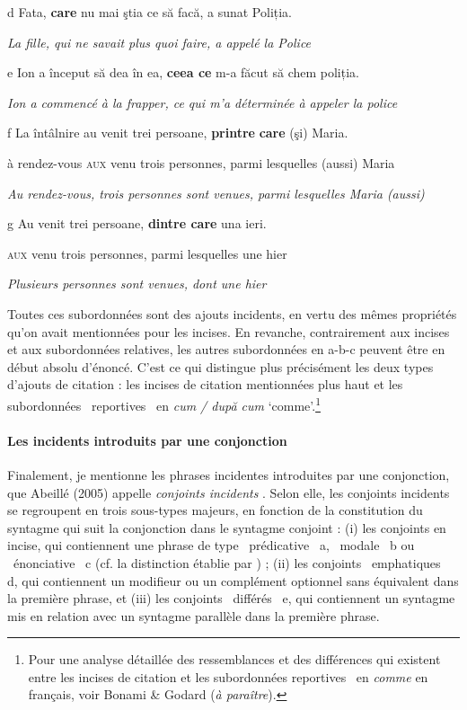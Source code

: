   d  Fata, \textbf{care} nu mai ştia ce să facă, a sunat Poliția.

{\itshape
La fille, qui ne savait plus quoi faire, a appelé la Police}

  e  Ion a început să dea în ea, \textbf{ceea ce} m-a făcut să chem poliția.

{\itshape
Ion a commencé à la frapper, ce qui m'a déterminée à appeler la police}

  f  La  întâlnire  au  venit  trei  persoane,  \textbf{printre}  \textbf{care}  (şi)  Maria. 

  à  rendez-vous\textsc{  aux } venu  trois  personnes,  parmi  lesquelles  (aussi)  Maria

{\itshape
Au rendez-vous, trois personnes sont venues, parmi lesquelles Maria (aussi)}

  g  Au  venit  trei  persoane,  \textbf{dintre  care}  una  ieri. 

\textsc{    aux } venu  trois  personnes,  parmi  lesquelles  une  hier

    \textit{Plusieurs personnes sont venues, dont une hier}  

Toutes ces subordonnées sont des ajouts incidents, en vertu des mêmes propriétés qu'on avait mentionnées pour les incises. En revanche, contrairement aux incises et aux subordonnées relatives, les autres subordonnées en a-b-c peuvent être en début absolu d'énoncé. C'est ce qui distingue plus précisément les deux types d'ajouts de citation : les incises de citation mentionnées plus haut et les subordonnées {\guillemotleft}~reportives~{\guillemotright} en \textit{cum / după cum} `comme'.\footnote{Pour une analyse détaillée des ressemblances et des différences qui existent entre les incises de citation et les subordonnées {\guillemotleft} reportives~{\guillemotright} en \textit{comme} en français, voir Bonami \& Godard (\textit{à paraître}).}  

\paragraph[Les incidents introduits par une conjonction]{Les incidents introduits par une conjonction}
\label{bkm:Ref301809092}Finalement, je mentionne les phrases incidentes introduites par une conjonction, que Abeillé (2005) appelle \textit{conjoints incidents} . Selon elle, les conjoints incidents se regroupent en trois sous-types majeurs, en fonction de la constitution du syntagme qui suit la conjonction dans le syntagme conjoint : (i) les conjoints en incise, qui contiennent une phrase de type {\guillemotleft}~prédicative~{\guillemotright} a, {\guillemotleft}~modale~{\guillemotright} b ou {\guillemotleft}~énonciative~{\guillemotright} c (cf. la distinction établie par \citet{Marandin1999}) ; (ii) les conjoints {\guillemotleft}~emphatiques~{\guillemotright} d, qui contiennent un modifieur ou un complément optionnel sans équivalent dans la première phrase, et (iii) les conjoints {\guillemotleft}~différés~{\guillemotright} e, qui contiennent un syntagme mis en relation avec un syntagme parallèle dans la première phrase. 


